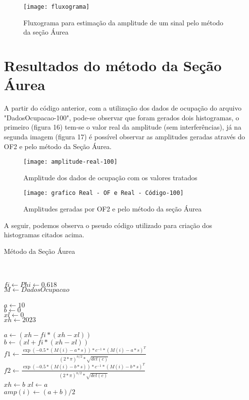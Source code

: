 \begin{figure}[H]
    \centering
    \caption{Fluxograma para estimação da amplitude de um sinal pelo método da seção Áurea}
    \texttt{[image: fluxograma]}
    \label{modeloNfce}
\end{figure}


\section{Resultados do método da Seção Áurea}
A partir do código anterior, com a utilização dos dados de ocupação do arquivo "DadosOcupacao-100", pode-se observar que foram gerados dois histogramas, o primeiro (figura 16) tem-se o valor real da amplitude (sem interferências), já na segunda imagem (figura 17) é possível observar as amplitudes geradas através do OF2 e pelo método da Seção Áurea.

\begin{figure}[H]
    \centering
    \caption{Amplitude dos dados de ocupação com os valores tratados}
    \texttt{[image: amplitude-real-100]}
    \label{modeloNfce}
\end{figure}

\begin{figure}[H]
    \centering
    \caption{Amplitudes geradas por OF2 e pelo método da seção Áurea }
    \texttt{[image: grafico Real - OF e Real - Código-100]}
    \label{modeloNfce}
\end{figure}


A seguir, podemos observa o pseudo código utilizado para criação dos histogramas citados acima.

\begin{algorithm}
\caption{Método da Seção Áurea}
\Comment{}\\
\\

$fi \gets Phi \gets 0.618$\\
$M \gets DadosOcupacao$\\
\\
\State $a \gets 10$\\
\State $b \gets 0$\\
\State $xl \gets 0$\\
\State $xh \gets 2023$\\
\\
    \State $a \gets (xh - fi * (xh-xl))$\\
    \State $b \gets (xl + fi * (xh-xl))$\\
    \State $f1 \gets \frac{\exp(-0.5 *( M(i)-a*s))*c^{-1}*(M(i)-a*s)^T}{(2*\pi)^{n/2}*\sqrt{det(c)}}$\\
    \State $f2 \gets \frac{\exp(-0.5 *( M(i)-b*s))*c^{-1}*(M(i)-b*s)^T}{(2*\pi)^{n/2}*\sqrt{det(c)}}$\\
        \State $xh \gets b$
    \Else
        \State $xl \gets a$
    \EndIf
\EndWhile\\
\State $amp(i) \gets (a+b)/2$\\
\EndFor
\end{algorithm}


